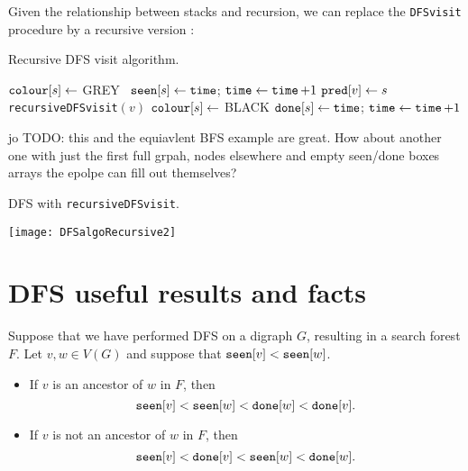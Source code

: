 Given the relationship between stacks and recursion, we can replace the \texttt{DFSvisit} procedure by
a recursive version : 

\begin{algorithm}[H]
  \caption{Recursive DFS visit algorithm.}
    \label{alg:DFSreccode}
\begin{algorithmic}[1]
	\State $\operatorname{\text{\texttt{colour}}}[s] \gets $ GREY \
	\State $\operatorname{\text{\texttt{seen}}}[s] \gets \operatorname{\text{\texttt{time}}}$; $\operatorname{\text{\texttt{time}}} \gets \operatorname{\text{\texttt{time}}} + 1$
		 
			\State $\operatorname{\text{\texttt{pred}}}[v] \gets s$ 
			\State \texttt{recursiveDFSvisit}$(v)$ 
		\EndIf
	\EndFor
	\State $\operatorname{\text{\texttt{colour}}}[s] \gets $ BLACK 
	\State $\operatorname{\text{\texttt{done}}}[s] \gets \operatorname{\text{\texttt{time}}} $; $\operatorname{\text{\texttt{time}}} \gets \operatorname{\text{\texttt{time}}} + 1$
\EndFunction
\end{algorithmic}
\end{algorithm}

\begin{Boxample}
jo TODO: this and the equiavlent BFS example are great. How about another one with just the first full grpah, nodes elsewhere and empty seen/done boxes arrays the epolpe can fill out themselves?

DFS with \texttt{recursiveDFSvisit}. 
\begin{center}
  \texttt{[image: DFSalgoRecursive2]}
\end{center}
\end{Boxample}

\section{DFS useful results and facts}
\begin{Theorem}
\label{thm:DFS-seen-done}
Suppose that we have performed DFS on a digraph $G$, resulting in a 
search forest $F$. Let $v, w \in V(G)$ and suppose that $\operatorname{\text{\texttt{seen}}}[v] < \operatorname{\text{\texttt{seen}}}[w]$. 

\begin{itemize}
\item
If $v$ is an ancestor of $w$ in $F$, then 
$$\operatorname{\text{\texttt{seen}}}[v] < \operatorname{\text{\texttt{seen}}}[w] < \operatorname{\text{\texttt{done}}}[w] < \operatorname{\text{\texttt{done}}}[v].$$
\item
If $v$ is not an ancestor of $w$ in $F$, then
$$\operatorname{\text{\texttt{seen}}}[v] < \operatorname{\text{\texttt{done}}}[v]  < \operatorname{\text{\texttt{seen}}}[w] < \operatorname{\text{\texttt{done}}}[w].$$
\end{itemize}
\end{Theorem}

